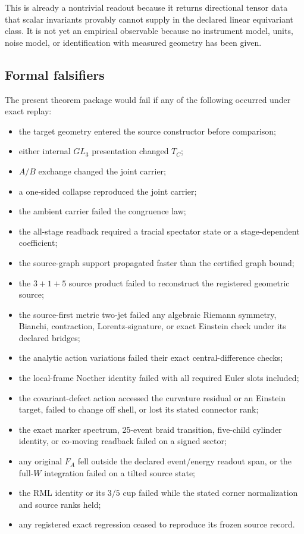 \documentclass[11pt]{article}
\theoremstyle{definition}
\theoremstyle{remark}
\begin{document}
This is already a nontrivial readout because it returns directional tensor data that scalar invariants provably cannot supply in the declared linear equivariant class. It is not yet an empirical observable because no instrument model, units, noise model, or identification with measured geometry has been given.

\subsection{Formal falsifiers}

The present theorem package would fail if any of the following occurred under exact replay:
\begin{itemize}
\item the target geometry entered the source constructor before comparison;
\item either internal $GL_3$ presentation changed $T_C$;
\item $A/B$ exchange changed the joint carrier;
\item a one-sided collapse reproduced the joint carrier;
\item the ambient carrier failed the congruence law;
\item the all-stage readback required a tracial spectator state or a stage-dependent coefficient;
\item the source-graph support propagated faster than the certified graph bound;
\item the $3+1+5$ source product failed to reconstruct the registered geometric source;
\item the source-first metric two-jet failed any algebraic Riemann symmetry, Bianchi, contraction, Lorentz-signature, or exact Einstein check under its declared bridges;
\item the analytic action variations failed their exact central-difference checks;
\item the local-frame Noether identity failed with all required Euler slots included;
\item the covariant-defect action accessed the curvature residual or an Einstein target, failed to change off shell, or lost its stated connector rank;
\item the exact marker spectrum, 25-event braid transition, five-child cylinder identity, or co-moving readback failed on a signed sector;
\item any original $F_A$ fell outside the declared event/energy readout span, or the full-$W$ integration failed on a tilted source state;
\item the RML identity or its $3/5$ cup failed while the stated corner normalization and source ranks held;
\item any registered exact regression ceased to reproduce its frozen source record.
\end{itemize}
\end{document}
